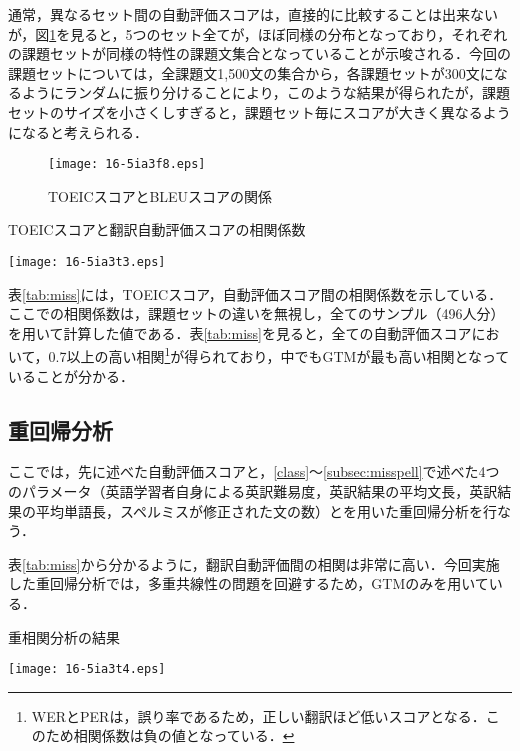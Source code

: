 \documentclass[japanese]{jnlp_1.4}
\begin{document}
通常，異なるセット間の自動評価スコアは，直接的に比較することは出来ないが，図\ref{fig:scut}を見ると，5つのセット全てが，ほぼ同様の分布となっており，それぞれの課題セットが同様の特性の課題文集合となっていることが示唆される．今回の課題セットについては，全課題文1,500文の集合から，各課題セットが300文になるようにランダムに振り分けることにより，このような結果が得られたが，課題セットのサイズを小さくしすぎると，課題セット毎にスコアが大きく異なるようになると考えられる．

\begin{figure}[t]
\begin{center}
\texttt{[image: 16-5ia3f8.eps]}
\end{center}
\caption{TOEICスコアとBLEUスコアの関係}
\label{fig:scut}
\end{figure}
\begin{table}[t]
\caption{TOEICスコアと翻訳自動評価スコアの相関係数}
\begin{center}
\texttt{[image: 16-5ia3t3.eps]}
\end{center}
\label{tab:miss}
\end{table}


表\ref{tab:miss}には，TOEICスコア，自動評価スコア間の相関係数を示している．ここでの相関係数は，課題セットの違いを無視し，全てのサンプル（496人分）を用いて計算した値である．表\ref{tab:miss}を見ると，全ての自動評価スコアにおいて，0.7以上の高い相関\footnote{WERとPERは，誤り率であるため，正しい翻訳ほど低いスコアとなる．このため相関係数は負の値となっている．}が得られており，中でもGTMが最も高い相関となっていることが分かる．

\subsection{重回帰分析}
\label{subsec:reg}

ここでは，先に述べた自動評価スコアと，\ref{class}〜\ref{subsec:misspell}で述べた4つのパラメータ（英語学習者自身による英訳難易度，英訳結果の平均文長，英訳結果の平均単語長，スペルミスが修正された文の数）とを用いた重回帰分析を行なう．

表\ref{tab:miss}から分かるように，翻訳自動評価間の相関は非常に高い．今回実施した重回帰分析では，多重共線性の問題を回避するため，GTMのみを用いている．

\begin{table}[t]
\caption{重相関分析の結果}
\begin{center}
\texttt{[image: 16-5ia3t4.eps]}
\end{center}
\label{tab:reg}
\end{table}
\end{document}
